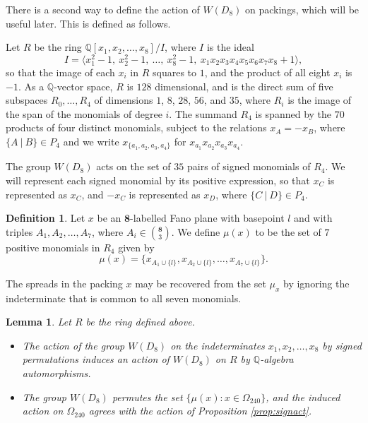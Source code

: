 \documentclass{amsart}
\theoremstyle{plain}
\newtheorem{lemma}[theorem]{Lemma}
\theoremstyle{definition}
\newtheorem{defn}[theorem]{Definition}
\theoremstyle{remark}
\numberwithin{equation}{section}
\newcommand{\Q}{{\mathbb Q}}
\newcommand{\eight}{{\mathbf 8}}
\newcommand{\qpx}{\Omega_{240}}
\begin{document}
There is a second way to define the action of $W(D_8)$ on packings, which will be useful later. This is
defined as follows.

Let $R$ be the ring $\Q[x_1, x_2, \ldots, x_8]/I$, where $I$ is the ideal $$
I = \langle x_1^2 - 1, \  x_2^2 - 1, \  \ldots, \ x_8^2 - 1, \ x_1x_2x_3x_4x_5x_6x_7x_8 + 1 \rangle
,$$ so that the image of each $x_i$ in $R$ squares to $1$, and the product of all eight $x_i$ is $-1$.
As a $\Q$-vector space, $R$ is $128$ dimensional, and is the direct sum of five subspaces $R_0, \ldots, R_4$ 
of dimensions $1$, $8$, $28$, $56$, and $35$, where $R_i$ is the image of the span of the 
monomials of degree $i$. The summand $R_4$ is spanned by the $70$ products of four distinct monomials, 
subject to the relations $x_A = -x_B$, where $\{A\ | \ B\} \in P_4$ and we write $x_{\{a_1, a_2, a_3, a_4\}}$ for 
$x_{a_1} x_{a_2} x_{a_3} x_{a_4}$. 

The group $W(D_8)$ acts on the set of $35$ pairs of signed monomials of $R_4$. We will represent each signed 
monomial by its positive expression, so that $x_C$ is represented as $x_C$, and $-x_C$ is represented as $x_D$, 
where $\{C\ | \ D\} \in P_4$.

\begin{defn}\label{def:splitrep}
Let $x$ be an $\eight$-labelled Fano plane with basepoint $l$ and with triples $A_1, A_2, \ldots, A_7$, where
$A_i \in \binom{\eight}{3}$. We define $\mu(x)$ to be the set of $7$ positive monomials in $R_4$ given by $$
\mu(x) = \{x_{A_1 \cup \{l\}}, x_{A_2 \cup \{l\}}, \ldots, x_{A_7 \cup \{l\}}\} 
.$$
\end{defn}

The spreads in the packing $x$ may be recovered from the set $\mu_x$ by ignoring the indeterminate that is 
common to all seven monomials.

\begin{lemma}\label{lem:sevenact}
Let $R$ be the ring defined above.
\begin{itemize}
\item[{\rm (i)}]{The action of the group $W(D_8)$ on the indeterminates $x_1, x_2, \ldots, x_8$ by signed 
permutations induces an action of $W(D_8)$ on $R$ by $\Q$-algebra automorphisms.}
\item[{\rm (ii)}]{The group $W(D_8)$ permutes the set $\{\mu(x) : x \in \qpx\}$, and the induced action 
on $\qpx$ agrees with the action of Proposition \ref{prop:signact}.}
\end{itemize}
\end{lemma}
\end{document}
